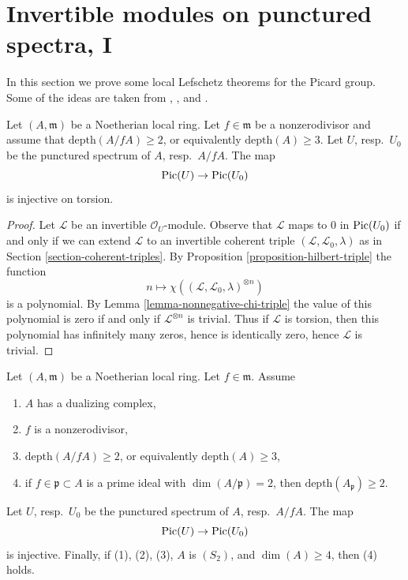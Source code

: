 \section{Invertible modules on punctured spectra, I}
\label{section-local-lefschetz-for-pic}

\noindent
In this section we prove some local Lefschetz theorems for the Picard group.
Some of the ideas are taken from
\cite{Kollar-pic}, \cite{Bhatt-local}, and \cite{Kollar-map-pic}.

\begin{lemma}
\label{lemma-injective-torsion-in-pic}
Let $(A, \mathfrak m)$ be a Noetherian local ring. Let $f \in \mathfrak m$
be a nonzerodivisor and assume that $\text{depth}(A/fA) \geq 2$, or equivalently
$\text{depth}(A) \geq 3$. Let $U$, resp.\ $U_0$ be the punctured
spectrum of $A$, resp.\ $A/fA$. The map
$$
\mathop{\mathrm{Pic}}\nolimits(U) \to \mathop{\mathrm{Pic}}\nolimits(U_0)
$$
is injective on torsion.
\end{lemma}

\begin{proof}
Let $\mathcal{L}$ be an invertible $\mathcal{O}_U$-module.
Observe that $\mathcal{L}$ maps to $0$ in $\mathop{\mathrm{Pic}}\nolimits(U_0)$
if and only if we can extend $\mathcal{L}$ to an invertible
coherent triple $(\mathcal{L}, \mathcal{L}_0, \lambda)$
as in Section \ref{section-coherent-triples}.
By Proposition \ref{proposition-hilbert-triple}
the function
$$
n \longmapsto \chi((\mathcal{L}, \mathcal{L}_0, \lambda)^{\otimes n})
$$
is a polynomial. By Lemma \ref{lemma-nonnegative-chi-triple}
the value of this polynomial is zero if and only if
$\mathcal{L}^{\otimes n}$ is trivial.
Thus if $\mathcal{L}$ is torsion, then this
polynomial has infinitely many zeros, hence is
identically zero, hence $\mathcal{L}$ is trivial.
\end{proof}

\begin{proposition}[Koll\'ar]
\label{proposition-injective-pic}
\begin{reference}
\cite[Theorem 1.9]{Kollar-map-pic}
\end{reference}
Let $(A, \mathfrak m)$ be a Noetherian local ring. Let $f \in \mathfrak m$.
Assume
\begin{enumerate}
\item $A$ has a dualizing complex,
\item $f$ is a nonzerodivisor,
\item $\text{depth}(A/fA) \geq 2$, or equivalently $\text{depth}(A) \geq 3$,
\item if $f \in \mathfrak p \subset A$ is a prime ideal with
$\dim(A/\mathfrak p) = 2$, then $\text{depth}(A_\mathfrak p) \geq 2$.
\end{enumerate}
Let $U$, resp.\ $U_0$ be the punctured spectrum of $A$, resp.\ $A/fA$. The map
$$
\mathop{\mathrm{Pic}}\nolimits(U) \to \mathop{\mathrm{Pic}}\nolimits(U_0)
$$
is injective. Finally, if (1), (2), (3), $A$ is $(S_2)$, and
$\dim(A) \geq 4$, then (4) holds.
\end{proposition}

